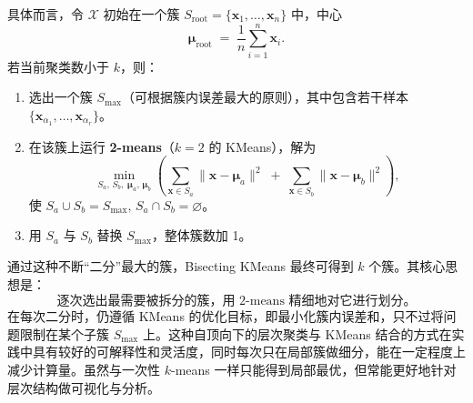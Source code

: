 \documentclass[12pt]{article}  %
\begin{document}
具体而言，令 $\mathcal{X}$ 初始在一个簇 $S_{\text{root}} = \{\mathbf{x}_1,\dots,\mathbf{x}_n\}$ 中，中心
\[
  \boldsymbol{\mu}_{\text{root}}
  \;=\;
  \frac{1}{n}
  \sum_{i=1}^n \mathbf{x}_i.
\]
若当前聚类数小于 $k$，则：
\begin{enumerate}
\item 选出一个簇 $S_{\max}$（可根据簇内误差最大的原则），其中包含若干样本 $\{\mathbf{x}_{\alpha_1}, \dots, \mathbf{x}_{\alpha_r}\}$。
\item 在该簇上运行 \textbf{2-means}（$k=2$ 的 KMeans），解为
\[
  \min_{S_a,\,S_b,\;\boldsymbol{\mu}_a,\,\boldsymbol{\mu}_b}
  \left(
    \sum_{\mathbf{x}\in S_a}\|\mathbf{x} - \boldsymbol{\mu}_a\|^2
    \;+\;
    \sum_{\mathbf{x}\in S_b}\|\mathbf{x} - \boldsymbol{\mu}_b\|^2
  \right),
\]
使 $S_a \cup S_b = S_{\max},\, S_a \cap S_b = \varnothing$。
\item 用 $S_a$ 与 $S_b$ 替换 $S_{\max}$，整体簇数加 1。
\end{enumerate}

通过这种不断“二分”最大的簇，Bisecting KMeans 最终可得到 $k$ 个簇。其核心思想是：
\[
  \text{逐次选出最需要被拆分的簇，用 } 2\text{-means 精细地对它进行划分。}
\]
在每次二分时，仍遵循 KMeans 的优化目标，即最小化簇内误差和，只不过将问题限制在某个子簇 $S_{\max}$ 上。这种自顶向下的层次聚类与 KMeans 结合的方式在实践中具有较好的可解释性和灵活度，同时每次只在局部簇做细分，能在一定程度上减少计算量。虽然与一次性 $k$-means 一样只能得到局部最优，但常能更好地针对层次结构做可视化与分析。
\end{document}
